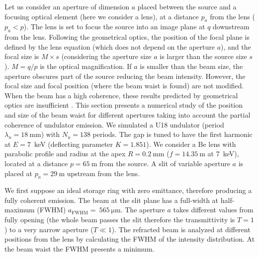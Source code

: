 \documentclass[doublecol]{epl2}
\newcommand{\inred}[1]{{\color{black}#1}} %
\begin{document}
Let us consider an aperture of dimension $a$ placed between the source and a focusing optical element (here we consider a lens), at a distance $p_a$ from the lens ($p_a < p$). The lens is set to focus the source into an image plane at $q$ downstream from the lens. Following the geometrical optics, the position of the focal plane is defined by the lens equation (which does not depend \inred{on} the aperture $a$), and the focal size is $M \times s$  (considering the aperture size $a$ is larger than the source size $s$). $M = q/p$ is the optical magnification. If $a$ is smaller than the beam size, the aperture obscures part of the source reducing the beam intensity. However, the focal size and focal position (where the beam waist is found) are not modified. When the beam has a high coherence, these results predicted by geometrical optics are insufficient \cite{hierarchical}. This section presents a numerical study of the position and size of the beam waist for different apertures taking into account the partial coherence of undulator emission. We simulated a U18 undulator (period $\lambda_u=\SI{18}{\milli\meter}$) with $N_u=138$ periods. The gap is tuned to have the first harmonic at $E=7$~keV (deflecting parameter $K=1.851$). We consider a Be lens with parabolic profile and radius at the \inred{apex} $R=\SI{0.2}{\milli\meter}$ ($f=\SI{14.35}{\meter}$ at 7~keV), located at a distance $p=\SI{65}{\meter}$ from the source. A slit of variable aperture $a$ is placed at $p_a=\SI{29}{\meter}$ upstream from the lens. 

We first suppose an ideal storage ring with zero emittance, therefore producing a fully coherent emission. The beam at the slit plane has a full-width at half-maximum (FWHM) $a_\text{FWHM}=~\SI{565}{\micro\meter}$. The aperture $a$ takes different values from fully opening (the whole beam passes the slit therefore the transmittivity is $T=1$) to a very narrow aperture ($T\ll1$). The refracted beam is analyzed at different positions from the lens by calculating the FWHM of the intensity distribution. At the beam waist the FWHM presents a minimum. 
\end{document}
